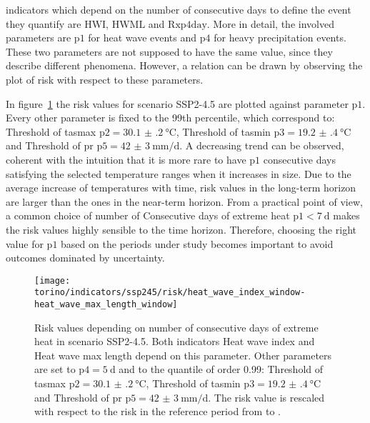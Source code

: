 \Glspl{indicator} which depend on the number of consecutive days to define the event they quantify are $\mathrm{HWI}$, $\mathrm{HWML}$ and $\mathrm{Rxp4day}$. More in detail, the involved parameters are $\mathrm{p1}$ for heat wave events and $\mathrm{p4}$ for heavy precipitation events. These two parameters are not supposed to have the same value, since they describe different phenomena. However, a relation can be drawn by observing the plot of risk with respect to these parameters.

In figure~\ref{fig:ssp245_risk_heat_wave_index_window-heat_wave_max_length_window} the risk values for scenario SSP2-4.5 are plotted against parameter $\mathrm{p1}$. Every other parameter is fixed to the 99th percentile, which correspond to: {Threshold of \gls{tasmax}} $\mathrm{p2} = \qty{30.1(2)}{\degreeCelsius}$, {Threshold of \gls{tasmin}} $\mathrm{p3} = \qty{19.2(4)}{\degreeCelsius}$ and {Threshold of \gls{pr}} $\mathrm{p5} = \qty{42(3)}{\milli\metre\per\day}$. A decreasing trend can be observed, coherent with the intuition that it is more rare to have $\mathrm{p1}$ consecutive days satisfying the selected temperature ranges when it increases in size. Due to the average increase of temperatures with time, risk values in the long-term horizon are larger than the ones in the near-term horizon.
From a practical point of view, a common choice of number of {Consecutive days of extreme heat} $\mathrm{p1} < \qty{7}{\day}$ makes the risk values highly sensible to the time horizon. Therefore, choosing the right value for $\mathrm{p1}$ based on the periods under study becomes important to avoid outcomes dominated by uncertainty.

\begin{figure}
  \centering
  \texttt{[image: torino/indicators/ssp245/risk/heat\_wave\_index\_window-heat\_wave\_max\_length\_window]}
  \caption{Risk values depending on number of consecutive days of extreme heat in scenario SSP2-4.5. Both indicators {Heat wave index} and {Heat wave max length} depend on this parameter. Other parameters are set to $\mathrm{p4} = \qty{5}{\day}$ and to the quantile of order 0.99: {Threshold of \gls{tasmax}} $\mathrm{p2} = \qty{30.1(2)}{\degreeCelsius}$, {Threshold of \gls{tasmin}} $\mathrm{p3} = \qty{19.2(4)}{\degreeCelsius}$ and {Threshold of \gls{pr}} $\mathrm{p5} = \qty{42(3)}{\milli\metre\per\day}$. The risk value is rescaled with respect to the risk in the reference period from  to .}
  \label{fig:ssp245_risk_heat_wave_index_window-heat_wave_max_length_window}
\end{figure}

